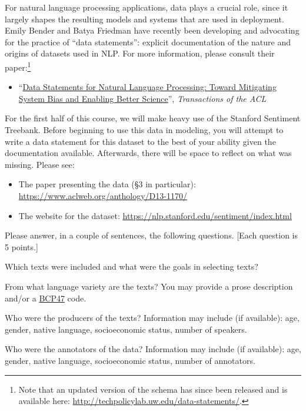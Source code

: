 \documentclass[11pt]{article}
\begin{document}
For natural language processing applications, data plays a crucial role, since it largely shapes the resulting models and systems that are used in deployment.  Emily Bender and Batya Friedman have recently been developing and advocating for the practice of ``data statements'': explicit documentation of the nature and origins of datasets used in NLP.  For more information, please consult their paper:\footnote{Note that an updated version of the schema has since been released and is available here: \url{http://techpolicylab.uw.edu/data-statements/}.}
\begin{itemize}
  \item ``\href{https://www.aclweb.org/anthology/Q18-1041/}{Data Statements for Natural Language Processing: Toward Mitigating System Bias and Enabling Better Science}'', \emph{Transactions of the ACL}
\end{itemize}
For the first half of this course, we will make heavy use of the Stanford Sentiment Treebank.  Before beginning to use this data in modeling, you will attempt to write a data statement for this dataset to the best of your ability given the documentation available.  Afterwards, there will be space to reflect on what was missing. Please see:
\begin{itemize}
  \item The paper presenting the data (\S3 in particular): \url{https://www.aclweb.org/anthology/D13-1170/}
  \item The website for the dataset: \url{https://nlp.stanford.edu/sentiment/index.html}
\end{itemize}
Please answer, in a couple of sentences, the following questions. [Each question is 5 points.]

\vspace{2em}
 Which texts were included  and  what  were  the  goals  in  selecting texts?

\vspace{2em}
 From what language variety are the texts?  You may provide a prose description and/or a \href{https://tools.ietf.org/rfc/bcp/bcp47.txt}{BCP47} code.

\vspace{2em}
 Who were the producers of the texts?  Information may include (if available): age, gender, native language, socioeconomic status, number of speakers.

\vspace{2em}
 Who were the annotators of the data?  Information may include (if available): age, gender, native language, socioeconomic status, number of annotators.
\end{document}
